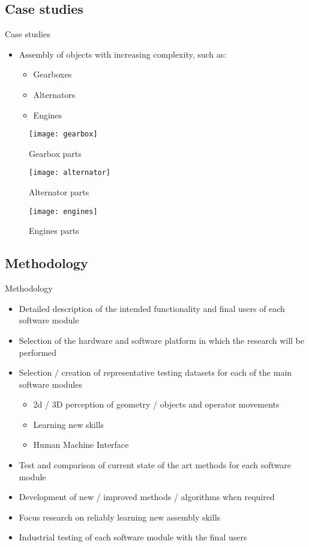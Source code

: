 \subsection{Case studies}
\begin{frame}{Case studies}
	\begin{itemize}
		\item Assembly of objects with increasing complexity, such as:
		\begin{itemize}
			\item Gearboxes
			\item Alternators
			\item Engines
		\end{itemize}
	\end{itemize}
	\begin{figure}[!ht]
		\centering
		\begin{minipage}{0.32\textwidth}
			\centering
			\texttt{[image: gearbox]}
			\caption{Gearbox parts}
		\end{minipage}%
		\begin{minipage}{.32\textwidth}
			\centering
			\texttt{[image: alternator]}
			\caption{Alternator parts}
		\end{minipage}%
		\begin{minipage}{0.32\textwidth}
			\centering
			\texttt{[image: engines]}
			\caption{Engines parts}
		\end{minipage}
	\end{figure}
\end{frame}

\subsection{Methodology}
\begin{frame}{Methodology}
	\begin{itemize}
		\item Detailed description of the intended functionality and final users of each software module
		\item Selection of the hardware and software platform in which the research will be performed
		\item Selection / creation of representative testing datasets for each of the main software modules
		\begin{itemize}
			\item 2d / 3D perception of geometry / objects and operator movements
			\item Learning new skills
			\item Human Machine Interface
		\end{itemize}
		\item Test and comparison of current state of the art methods for each software module
		\item Development of new / improved methods / algorithms when required
		\item Focus research on reliably learning new assembly skills
		\item Industrial testing of each software module with the final users
	\end{itemize}
\end{frame}
